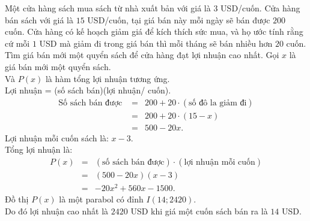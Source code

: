 \begin{baitap}%
	Một cửa hàng sách mua sách từ nhà xuất bản với giá là $3$ USD/cuốn. Cửa hàng bán sách với giá là $15$  USD/cuốn, tại giá bán này mỗi ngày sẽ bán được $200$ cuốn. Cửa hàng có kế hoạch giảm giá để kích thích sức mua, và họ ước tính rằng cứ mỗi $1$ USD mà giảm đi trong giá bán thì mỗi tháng sẽ bán nhiều hơn $20$ cuốn. Tìm giá bán mới một quyển sách để cửa hàng đạt lợi nhuận cao nhất.
	\loigiai
	{
		Gọi $x$ là giá bán mới một quyển sách.\\
		Và $P(x)$ là hàm tổng lợi nhuận tương ứng.\\
		Lợi nhuận = (số sách bán)(lợi nhuận/ cuốn).
		\allowdisplaybreaks
		\begin{eqnarray*}
			\text{Số sách bán được }& =&200+20 \cdot (\text{số đô la giảm đi})\\
			&= &200+20\cdot (15-x)\\
			&=& 500-20x.
		\end{eqnarray*}
		Lợi nhuận mỗi cuốn sách là: $x-3$.\\
		Tổng lợi nhuận là:
		\allowdisplaybreaks
		\begin{eqnarray*}
			P(x)&=& (\text{số sách bán được})\cdot (\text{lợi nhuận mỗi cuốn})\\
			&= & (500-20x)(x-3)\\
			&= &-20x^2+560x-1500.
		\end{eqnarray*}
		Đồ thị $P(x)$ là một parabol có đỉnh $I(14;2420)$.\\
		Do đó lợi nhuận cao nhất là $2420$ USD khi giá một cuốn sách bán ra là $14$ USD.
	}
\end{baitap}


